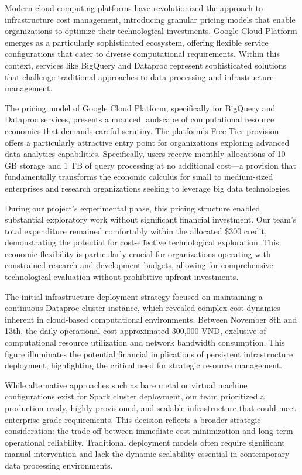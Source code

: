 Modern cloud computing platforms have revolutionized the approach to infrastructure cost management,
introducing granular pricing models that enable organizations to optimize their technological
investments. Google Cloud Platform emerges as a particularly sophisticated ecosystem, offering
flexible service configurations that cater to diverse computational requirements. Within this
context, services like BigQuery and Dataproc represent sophisticated solutions that challenge
traditional approaches to data processing and infrastructure management.

The pricing model of Google Cloud Platform, specifically for BigQuery and Dataproc services,
presents a nuanced landscape of computational resource economics that demands careful scrutiny. The
platform's Free Tier provision offers a particularly attractive entry point for organizations
exploring advanced data analytics capabilities. Specifically, users receive monthly allocations of
10 GB storage and 1 TB of query processing at no additional cost—a provision that fundamentally
transforms the economic calculus for small to medium-sized enterprises and research organizations
seeking to leverage big data technologies.

During our project's experimental phase, this pricing structure enabled substantial exploratory work
without significant financial investment. Our team's total expenditure remained comfortably within
the allocated \$300 credit, demonstrating the potential for cost-effective technological exploration.
This economic flexibility is particularly crucial for organizations operating with constrained
research and development budgets, allowing for comprehensive technological evaluation without
prohibitive upfront investments.

The initial infrastructure deployment strategy focused on maintaining a continuous Dataproc cluster
instance, which revealed complex cost dynamics inherent in cloud-based computational environments.
Between November 8th and 13th, the daily operational cost approximated 300,000 VND, exclusive of
computational resource utilization and network bandwidth consumption. This figure illuminates the
potential financial implications of persistent infrastructure deployment, highlighting the critical
need for strategic resource management.

While alternative approaches such as bare metal or virtual machine configurations exist for Spark
cluster deployment, our team prioritized a production-ready, highly provisioned, and scalable
infrastructure that could meet enterprise-grade requirements. This decision reflects a broader
strategic consideration: the trade-off between immediate cost minimization and long-term operational
reliability. Traditional deployment models often require significant manual intervention and lack
the dynamic scalability essential in contemporary data processing environments.

